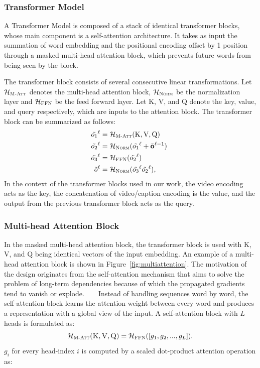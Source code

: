 \subsubsection{Transformer Model}
A Transformer Model is composed of a stack of identical transformer blocks, whose main component is a self-attention architecture.
It takes as input the summation of word embedding and the positional encoding offset by 1 position through a masked multi-head attention block, which prevents future words from being seen by the block. 

The transformer block consists of several consecutive linear transformations.
Let $\mathcal{H}_{\textsc{M-Att}}$ denotes the multi-head attention block, $\mathcal{H}_{\textsc{Norm}}$ be the normalization layer and $\mathcal{H}_{\textsc{FFN}}$ be the feed forward layer.
Let K, V, and Q denote the key, value, and query respectively, which are inputs to the attention block.
The transformer block can be summarized as follows:
\begin{equation}
\begin{split}
\tilde{o_1}^\ell&=\mathcal{H}_{\textsc{M-Att}}(\textrm{K}, \textrm{V}, \textrm{Q}) \\
\tilde{o_2}^\ell &= \mathcal{H}_{\textsc{Norm}}(\tilde{o_1}^\ell + \tilde{\mathbf{o}}^{\ell-1})   \\
\tilde{o_3}^\ell &= \mathcal{H}_{\textsc{FFN}}(\tilde{o_2}^\ell)   \\
\tilde{o}^{\ell}&= \mathcal{H}_{\textsc{Norm}}(\tilde{o_3}^\ell \tilde{o_2}^\ell),
\end{split}
\end{equation}
In the context of the transformer blocks used in our work, the video encoding acts as the key, the concatenation of video/caption encoding is the value, and the output from the previous transformer block acts as the query.


\subsubsection{Multi-head Attention Block}
\label{sec:att_block}
In the masked multi-head attention block, the transformer block is used with K, V, and Q being identical vectors of the input embedding.
An example of a multi-head attention block is shown in Figure~\ref{fig:multiattention}.
The motivation of the design originates from the self-attention mechanism that aims to solve the problem of long-term dependencies because of which the propagated gradients tend to vanish or explode. 
    Instead of handling sequences word by word, the self-attention block learns the attention weight between every word and produces a representation with a global view of the input.
A self-attention block with $L$ heads is formulated as: 
\begin{equation}
\mathcal{H}_{\textsc{M-Att}}(\textsc{K}, \textsc{V}, \textsc{Q}) = \mathcal{H}_{\textsc{FFN}}([{g_1}, {g_2}, ..., {g_L}]).
\end{equation}
$g_i$ for every head-index $i$ is computed by a scaled dot-product attention operation as:

